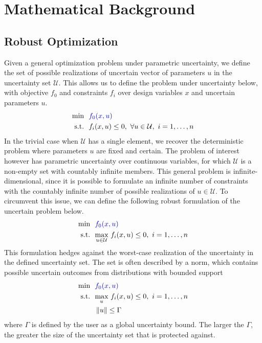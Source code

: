 \section{Mathematical Background}

\subsection{Robust Optimization}

Given a general optimization problem under parametric uncertainty, we define the set of possible
realizations of uncertain vector of parameters $u$ in the uncertainty set $\mathcal{U}$. This
allows us to define the problem under uncertainty below{\color{blue}, with objective $f_0$ and constraints $f_i$ over
design variables $x$ and uncertain parameters $u$}.
\begin{align*}
    \text{min} &~~{\color{blue}f_0(x,u)} \\
    \text{s.t.}     &~~f_i(x,u) \leq 0,~\forall u \in \mathcal{U},~i = 1,\ldots,n
\end{align*}
{\color{blue}In the trivial case when $\mathcal{U}$ has a single element, we recover
the deterministic problem where parameters $u$ are fixed and certain.
The problem of interest however has parametric uncertainty over continuous variables, for which
$\mathcal{U}$ is a non-empty set with countably infinite members.}
This general problem is infinite-dimensional, since it is possible to formulate an infinite number of constraints
with the countably infinite number of possible realizations of $u \in \mathcal{U}$. To circumvent this issue,
we can define the following robust formulation of the uncertain problem below.
\begin{align*}
    \text{min} &~~{\color{blue}f_0(x,u)} \\
    \text{s.t.}     &~~\underset{u \in \mathcal{U}}{\text{max}}~f_i(x,u) \leq 0,~i = 1,\ldots,n
\end{align*}
This formulation hedges against the worst-case realization of the uncertainty in the defined uncertainty
set. The set is often described by a norm, which contains possible uncertain outcomes from distributions with
bounded support
\begin{equation}
    \begin{split}
        \text{min} &~~{\color{blue}f_0(x,u)} \\
    \text{s.t.}     &~~\underset{u}{\text{max}}~f_i(x,u) \leq 0,~i = 1,\ldots,n \\
                    &~~\left\lVert u \right\rVert \leq \Gamma \\
        \end{split}
    \label{eq:normform}
\end{equation}
where $\Gamma$ is defined by the user as a global uncertainty bound. The larger the $\Gamma$,
the greater the size of the uncertainty set that is protected against.

